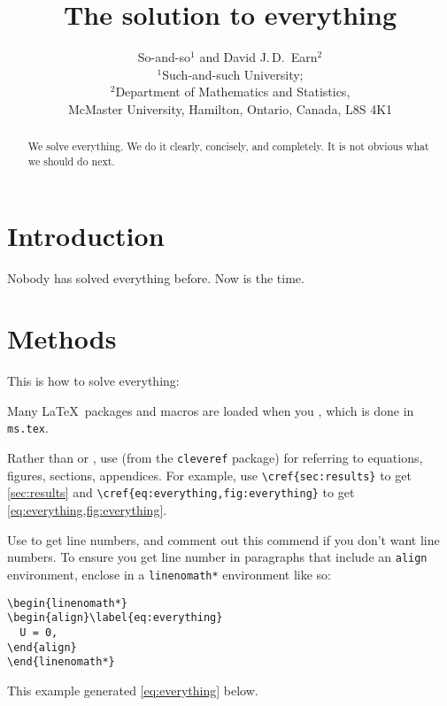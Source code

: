 \documentclass[12pt]{article}
\title{The solution to everything}
\author{So-and-so$^1$ and David J.\,D.\ Earn$^2$\\
  $^1$Such-and-such University;\\
  $^2$Department of Mathematics and Statistics,\\
  McMaster University, Hamilton, Ontario, Canada, L8S 4K1}
\begin{document}
\maketitle

\linenumbers

\begin{abstract}
  We solve everything.  We do it clearly, concisely, and completely.
  It is not obvious what we should do next.
\end{abstract}



\section{Introduction}\label{sec:intro}

Nobody has solved everything before.
Now is the time.

\section{Methods}\label{sec:methods}

This is how to solve everything:

Many \LaTeX\ packages and macros are loaded when you
\verb||, which is done in \texttt{ms.tex}.

Rather than  or , use  (from the
\texttt{cleveref} package) for referring to equations, figures,
sections, appendices.  For example, use \verb|\cref{sec:results}| to
get \cref{sec:results} and \verb|\cref{eq:everything,fig:everything}|
to get \cref{eq:everything,fig:everything}.

Use  to get line numbers, and comment out this
commend if you don't want line numbers.  To ensure you get line number
in paragraphs that include an \texttt{align} environment, enclose in a
\verb|linenomath*| environment like so:
\begin{verbatim}
\begin{linenomath*}
\begin{align}\label{eq:everything}
  U = 0,
\end{align}
\end{linenomath*}
\end{verbatim}
This example generated \cref{eq:everything} below.
\end{document}
